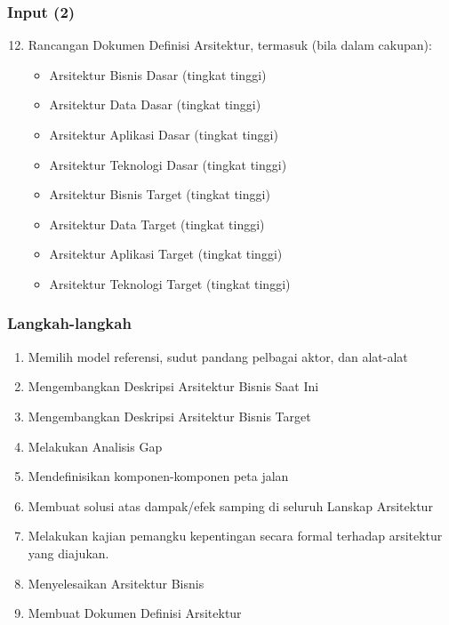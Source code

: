 \documentclass[aspectratio=169]{beamer}
\begin{document}
	\begin{frame}
		\frametitle{Input (2)}
		\begin{enumerate}
			\setcounter{enumi}{11}
			\item Rancangan Dokumen Definisi Arsitektur, termasuk (bila dalam cakupan):
			\begin{itemize}
				\item Arsitektur Bisnis Dasar (tingkat tinggi)
				\item Arsitektur Data Dasar (tingkat tinggi)
				\item Arsitektur Aplikasi Dasar (tingkat tinggi)
				\item Arsitektur Teknologi Dasar (tingkat tinggi)
				\item Arsitektur Bisnis Target (tingkat tinggi)
				\item Arsitektur Data Target (tingkat tinggi)
				\item Arsitektur Aplikasi Target (tingkat tinggi)
				\item Arsitektur Teknologi Target (tingkat tinggi)
			\end{itemize}
		\end{enumerate}
	\end{frame}
	
	\begin{frame}
		\frametitle{Langkah-langkah}
		\begin{enumerate}
			\item Memilih model referensi, sudut pandang pelbagai aktor, dan alat-alat
			\item Mengembangkan Deskripsi Arsitektur Bisnis Saat Ini
			\item Mengembangkan Deskripsi Arsitektur Bisnis Target
			\item Melakukan Analisis Gap
			\item Mendefinisikan komponen-komponen peta jalan
			\item Membuat solusi atas dampak/efek samping di seluruh Lanskap Arsitektur
			\item Melakukan kajian pemangku kepentingan secara formal terhadap arsitektur yang diajukan.
			\item Menyelesaikan Arsitektur Bisnis
			\item Membuat Dokumen Definisi Arsitektur
		\end{enumerate}
		
		
	\end{frame}
	
\end{document}

